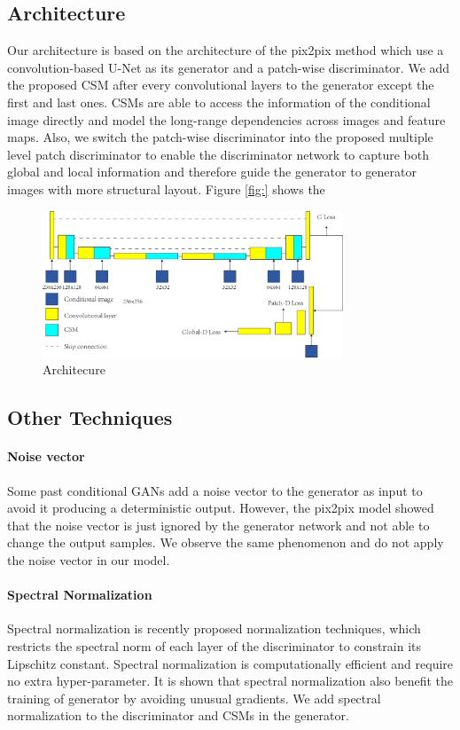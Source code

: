 \subsection{Architecture}
Our architecture is based on the architecture of the pix2pix method which use a convolution-based U-Net \cite{Unet} as its generator and a patch-wise discriminator. We add the proposed CSM after every convolutional layers to the generator except the first and last ones. CSMs are able to access the information of the conditional image directly and model the long-range dependencies across images and feature maps. Also, we switch the patch-wise discriminator into the proposed multiple level patch discriminator to enable the discriminator network to capture both global and local information and therefore guide the generator to generator images with more structural layout.  
Figure \ref{fig:} shows the 
%
\begin{figure}
	\label{fig:architecture}
	\includegraphics[width=0.8\textwidth]{figures/architecture}
	\caption{Architecure}
\end{figure}
%
\subsection{Other Techniques}
%
\paragraph{Noise vector} Some past conditional GANs add a noise vector to the generator as input to avoid it producing a deterministic output. However, the pix2pix model showed that the noise vector is just ignored by the generator network and not able to change the output samples. We observe the same phenomenon and do not apply the noise vector in our model. 
\paragraph{Spectral Normalization} Spectral normalization \cite{SN} is recently proposed normalization techniques, which restricts the spectral norm of each layer of the discriminator to constrain its Lipschitz constant. Spectral normalization is computationally efficient and require no extra hyper-parameter. It is shown that spectral normalization also benefit the training of generator by avoiding unusual gradients. We add spectral normalization to the discriminator and CSMs in the generator.
%
